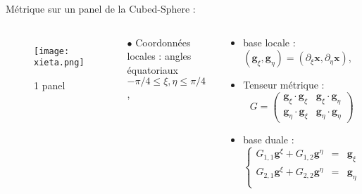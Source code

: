 \documentclass[11pt]{beamer}
\begin{document}
\begin{frame}{Métrique sur un panel de la Cubed-Sphere :}
\begin{columns}
\begin{figure}
\begin{center}
\texttt{[image: xieta.png]}
\end{center}
\caption{1 panel}
\end{figure}
\begin{block}{}
$\bullet$ Coordonnées locales : angles équatoriaux $- \pi/4 \leq \xi, \eta \leq \pi/4$ ,
\end{block}
\begin{block}{}
\begin{itemize}
\item base locale : $(\mathbf{g}_{\xi}, \mathbf{g}_{\eta} ) = ( \partial_{\xi} \mathbf{x}, \partial_{\eta} \mathbf{x} )$,
\item Tenseur métrique :
$$G = \begin{pmatrix}
\mathbf{g}_{\xi} \cdot \mathbf{g}_{\xi} & \mathbf{g}_{\xi} \cdot \mathbf{g}_{\eta} \\ 
\mathbf{g}_{\eta} \cdot \mathbf{g}_{\xi} & \mathbf{g}_{\eta} \cdot \mathbf{g}_{\eta}
\end{pmatrix} $$
\item base duale :
\begin{equation*}
\left\{
\begin{array}{ccc}
G_{1,1}\mathbf{g}^{\xi} + G_{1,2}\mathbf{g}^{\eta} & = & \mathbf{g}_{\xi} \\ 
G_{2,1}\mathbf{g}^{\xi} + G_{2,2}\mathbf{g}^{\eta} & = & \mathbf{g}_{\eta} \\ 
\end{array} 
\right.
\end{equation*}


\end{itemize}
\end{block}
\end{columns}
\end{frame}
\end{document}
